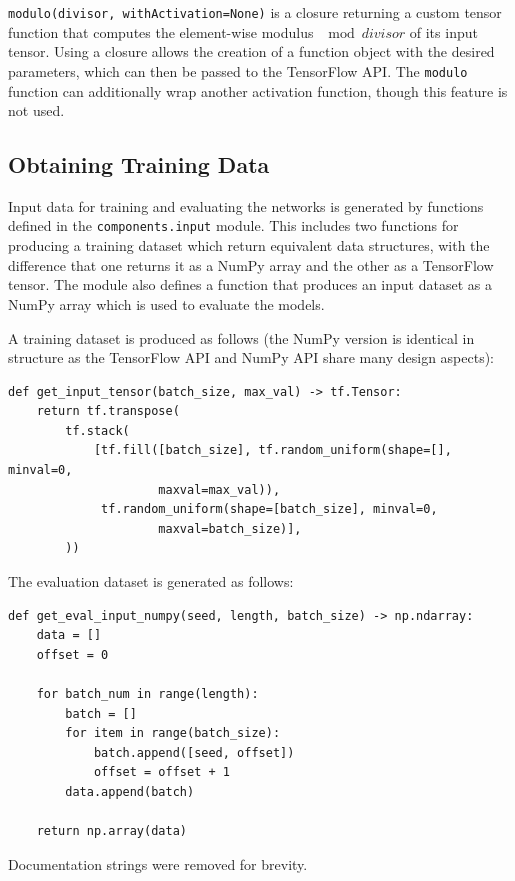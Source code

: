 \documentclass[12pt, titlepage]{report}
\theoremstyle{definition}
\begin{document}
\texttt{modulo(divisor, withActivation=None)} is a closure returning a custom tensor function that computes the element-wise modulus $\mod{divisor}$ of its input tensor. Using a closure allows the creation of a function object with the desired parameters, which can then be passed to the TensorFlow API. The \texttt{modulo} function can additionally wrap another activation function, though this feature is not used.


\subsection{Obtaining Training Data}
Input data for training and evaluating the networks is generated by functions defined in the \texttt{components.input} module. This includes two functions for producing a training dataset which return equivalent data structures, with the difference that one returns it as a NumPy array and the other as a TensorFlow tensor. The module also defines a function that produces an input dataset as a NumPy array which is used to evaluate the models.

A training dataset is produced as follows (the NumPy version is identical in structure as the TensorFlow API and NumPy API share many design aspects):

\begin{verbatim}
def get_input_tensor(batch_size, max_val) -> tf.Tensor:
    return tf.transpose(
        tf.stack(
            [tf.fill([batch_size], tf.random_uniform(shape=[], minval=0, 
                     maxval=max_val)),
             tf.random_uniform(shape=[batch_size], minval=0, 
                     maxval=batch_size)],
        ))
\end{verbatim}

The evaluation dataset is generated as follows:

\begin{verbatim}
def get_eval_input_numpy(seed, length, batch_size) -> np.ndarray:
    data = []
    offset = 0

    for batch_num in range(length):
        batch = []
        for item in range(batch_size):
            batch.append([seed, offset])
            offset = offset + 1
        data.append(batch)

    return np.array(data)
\end{verbatim}

Documentation strings were removed for brevity.
\end{document}
